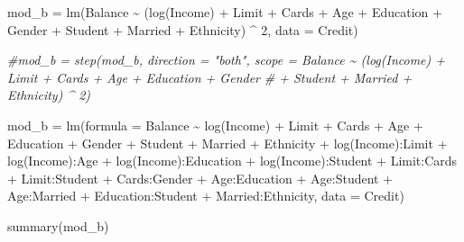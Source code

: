 \documentclass[
]{article}
\newenvironment{Shaded}{\begin{snugshade}}{\end{snugshade}}
\newcommand{\AttributeTok}[1]{\textcolor[rgb]{0.77,0.63,0.00}{#1}}
\newcommand{\CommentTok}[1]{\textcolor[rgb]{0.56,0.35,0.01}{\textit{#1}}}
\newcommand{\DecValTok}[1]{\textcolor[rgb]{0.00,0.00,0.81}{#1}}
\newcommand{\FunctionTok}[1]{\textcolor[rgb]{0.00,0.00,0.00}{#1}}
\newcommand{\NormalTok}[1]{#1}
\newcommand{\OtherTok}[1]{\textcolor[rgb]{0.56,0.35,0.01}{#1}}
\newcommand{\SpecialCharTok}[1]{\textcolor[rgb]{0.00,0.00,0.00}{#1}}
\begin{document}
\begin{Shaded}
\begin{Highlighting}[]
\NormalTok{mod\_b }\OtherTok{=} \FunctionTok{lm}\NormalTok{(Balance }\SpecialCharTok{\textasciitilde{}}\NormalTok{ (}\FunctionTok{log}\NormalTok{(Income) }\SpecialCharTok{+}\NormalTok{ Limit }\SpecialCharTok{+}\NormalTok{ Cards }\SpecialCharTok{+}\NormalTok{ Age }\SpecialCharTok{+}\NormalTok{ Education }\SpecialCharTok{+}\NormalTok{ Gender}
                   \SpecialCharTok{+}\NormalTok{ Student }\SpecialCharTok{+}\NormalTok{ Married }\SpecialCharTok{+}\NormalTok{ Ethnicity) }\SpecialCharTok{\^{}} \DecValTok{2}\NormalTok{, }\AttributeTok{data =}\NormalTok{ Credit)}

\CommentTok{\#mod\_b = step(mod\_b, direction = "both", scope = Balance \textasciitilde{} (log(Income) + Limit + Cards + Age + Education + Gender}
\CommentTok{\#                   + Student + Married + Ethnicity) \^{} 2)}

\NormalTok{mod\_b }\OtherTok{=} \FunctionTok{lm}\NormalTok{(}\AttributeTok{formula =}\NormalTok{ Balance }\SpecialCharTok{\textasciitilde{}} \FunctionTok{log}\NormalTok{(Income) }\SpecialCharTok{+}\NormalTok{ Limit }\SpecialCharTok{+}\NormalTok{ Cards }\SpecialCharTok{+}\NormalTok{ Age }\SpecialCharTok{+}\NormalTok{ Education }\SpecialCharTok{+} 
\NormalTok{    Gender }\SpecialCharTok{+}\NormalTok{ Student }\SpecialCharTok{+}\NormalTok{ Married }\SpecialCharTok{+}\NormalTok{ Ethnicity }\SpecialCharTok{+} \FunctionTok{log}\NormalTok{(Income)}\SpecialCharTok{:}\NormalTok{Limit }\SpecialCharTok{+} 
    \FunctionTok{log}\NormalTok{(Income)}\SpecialCharTok{:}\NormalTok{Age }\SpecialCharTok{+} \FunctionTok{log}\NormalTok{(Income)}\SpecialCharTok{:}\NormalTok{Education }\SpecialCharTok{+} \FunctionTok{log}\NormalTok{(Income)}\SpecialCharTok{:}\NormalTok{Student }\SpecialCharTok{+} 
\NormalTok{    Limit}\SpecialCharTok{:}\NormalTok{Cards }\SpecialCharTok{+}\NormalTok{ Limit}\SpecialCharTok{:}\NormalTok{Student }\SpecialCharTok{+}\NormalTok{ Cards}\SpecialCharTok{:}\NormalTok{Gender }\SpecialCharTok{+}\NormalTok{ Age}\SpecialCharTok{:}\NormalTok{Education }\SpecialCharTok{+} 
\NormalTok{    Age}\SpecialCharTok{:}\NormalTok{Student }\SpecialCharTok{+}\NormalTok{ Age}\SpecialCharTok{:}\NormalTok{Married }\SpecialCharTok{+}\NormalTok{ Education}\SpecialCharTok{:}\NormalTok{Student }\SpecialCharTok{+}\NormalTok{ Married}\SpecialCharTok{:}\NormalTok{Ethnicity, }
    \AttributeTok{data =}\NormalTok{ Credit)}

\FunctionTok{summary}\NormalTok{(mod\_b)}
\end{Highlighting}
\end{Shaded}
\end{document}
